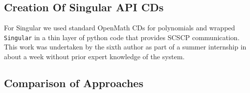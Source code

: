 \subsection{Creation Of Singular API CDs}

For Singular we used standard OpenMath CDs for polynomials and wrapped
\texttt{Singular} in a thin layer of python code that provides SCSCP
communication. This work was undertaken by the sixth author as part of a summer
internship in about a week without prior expert
knowledge of the system.

\subsection{Comparison of Approaches}


